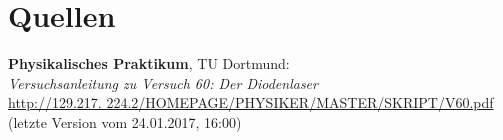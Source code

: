 \documentclass[captions=tableheading]{scrartcl}
\begin{document}
\section{Quellen}
\begin{enumerate}[label={[\arabic*]}]
\item \label{q:anleitung} \textbf{Physikalisches Praktikum}, TU Dortmund: \\
\textit{Versuchsanleitung zu Versuch 60: Der Diodenlaser} \\
\url{http://129.217.
224.2/HOMEPAGE/PHYSIKER/MASTER/SKRIPT/V60.pdf} (letzte Version vom 24.01.2017, 16:00)
\end{enumerate}
\end{document}
